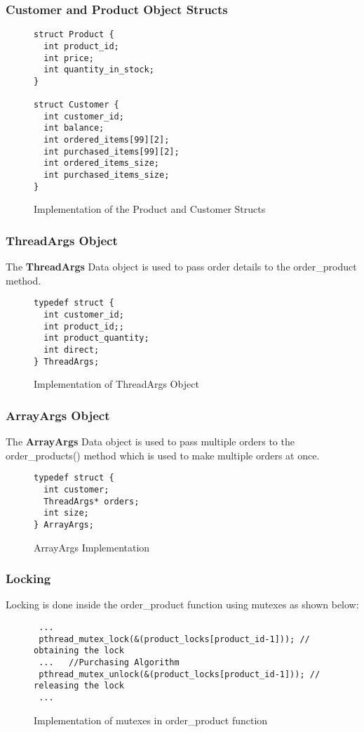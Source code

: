 \documentclass[pdftex,12pt,a4paper]{article}
\begin{document}
\subsubsection{Customer and Product Object Structs}
\begin{figure}[H]
\centering
\begin{lstlisting}
struct Product {
  int product_id;
  int price;
  int quantity_in_stock;
}

struct Customer {
  int customer_id;
  int balance;
  int ordered_items[99][2];
  int purchased_items[99][2];
  int ordered_items_size;
  int purchased_items_size;
}
\end{lstlisting}
\label{fig:customer_product_structs}
\caption{Implementation of the Product and Customer Structs}
\end{figure}

\subsubsection{ThreadArgs Object}
The \textbf{ThreadArgs} Data object is used to pass order details to the order\_product method.
\begin{figure}[H]
\centering
\begin{lstlisting}
typedef struct {
  int customer_id;
  int product_id;;
  int product_quantity;
  int direct;
} ThreadArgs;
\end{lstlisting}
\label{fig:threadargs_struct}
\caption{Implementation of ThreadArgs Object}
\end{figure}

\subsubsection{ArrayArgs Object}
The \textbf{ArrayArgs} Data object is used to pass multiple orders to the order\_products() method which is used to make multiple orders at once.
\begin{figure}[H]
\centering
\begin{lstlisting}
typedef struct {
  int customer;
  ThreadArgs* orders;
  int size;
} ArrayArgs;
\end{lstlisting}
\label{fig:arrayargs_struct}
\caption{ArrayArgs Implementation}
\end{figure}

\subsubsection{Locking}
Locking is done inside the order\_product function using mutexes as shown below:
\begin{figure}[H]
\begin{lstlisting}
 ...
 pthread_mutex_lock(&(product_locks[product_id-1])); // obtaining the lock
 ...   //Purchasing Algorithm
 pthread_mutex_unlock(&(product_locks[product_id-1])); // releasing the lock
 ...
\end{lstlisting}
\label{fig:locks_implementation}
\caption{Implementation of mutexes in order\_product function}
\end{figure}
\end{document}
